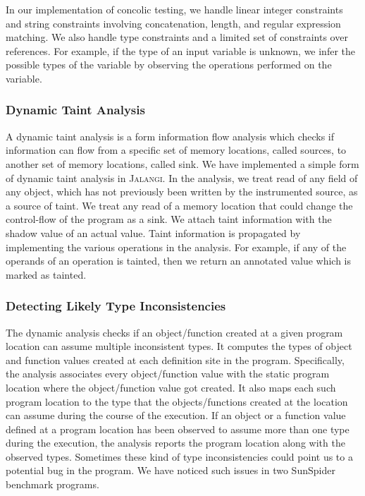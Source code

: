 \documentclass{sig-alternate}
\def\jalangi{\textsc{Jalangi}}
\begin{document}
In our implementation of concolic testing, we handle linear integer
constraints and string constraints involving concatenation, length,
and regular expression matching.  We also handle type constraints and
a limited set of constraints over references.  For example, if the type
of an input variable is unknown, we infer the possible types of the
variable by observing the operations performed on the variable.

\subsubsection*{Dynamic Taint Analysis}
\label{sec:taint-analysis}

A dynamic taint analysis is a form information flow analysis which
checks if information can flow from a specific set of memory
locations, called sources, to another set of memory locations, called
sink.  We have implemented a simple form of dynamic taint analysis in
\jalangi{}.  In the analysis, we treat read of any field of any
object, which has not previously been written by the instrumented
source, as a source of taint.  We treat any read of a memory location
that could change the control-flow of the program as a sink.  We
attach taint information with the shadow value of an actual value.
Taint information is propagated by implementing the various operations
in the analysis.  For example, if any of the operands of an operation
is tainted, then we return an annotated value which is marked as
tainted.

\subsubsection*{Detecting Likely Type Inconsistencies}
\label{sec:detect-likely-type}

The dynamic analysis checks if an object/function created at a given
program location can assume multiple inconsistent types.  It computes
the types of object and function values created at each definition
site in the program.  Specifically, the analysis associates every
object/function value with the static program location where the
object/function value got created.  It also maps each such program
location to the type that the objects/functions created at the
location can assume during the course of the execution.  If an object
or a function value defined at a program location has been observed to
assume more than one type during the execution, the analysis reports
the program location along with the observed types.  Sometimes these
kind of type inconsistencies could point us to a potential bug in the
program.  We have noticed such issues in two SunSpider benchmark
programs.
\end{document}
